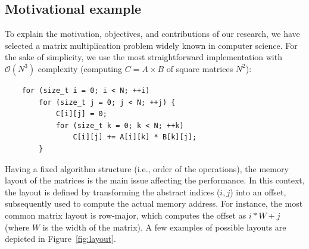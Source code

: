 \subsection{Motivational example}

To explain the motivation, objectives, and contributions of our research, we have selected a matrix multiplication problem widely known in computer science. For the sake of simplicity, we use the most straightforward implementation with $\mathcal{O}(N^3)$ complexity (computing $C = A \times B$ of square matrices $N^2$):

\begin{verbatim}
    for (size_t i = 0; i < N; ++i)
        for (size_t j = 0; j < N; ++j) {
            C[i][j] = 0;
            for (size_t k = 0; k < N; ++k)
                C[i][j] += A[i][k] * B[k][j];
        }
\end{verbatim}

Having a fixed algorithm structure (i.e., order of the operations), the memory layout of the matrices is the main issue affecting the performance. In this context, the layout is defined by transforming the abstract indices ($i,j$) into an offset, subsequently used to compute the actual memory address. For instance, the most common matrix layout is row-major, which computes the offset as $i*W + j$ (where $W$ is the width of the matrix). A few examples of possible layouts are depicted in Figure~\ref{fig:layout}.

